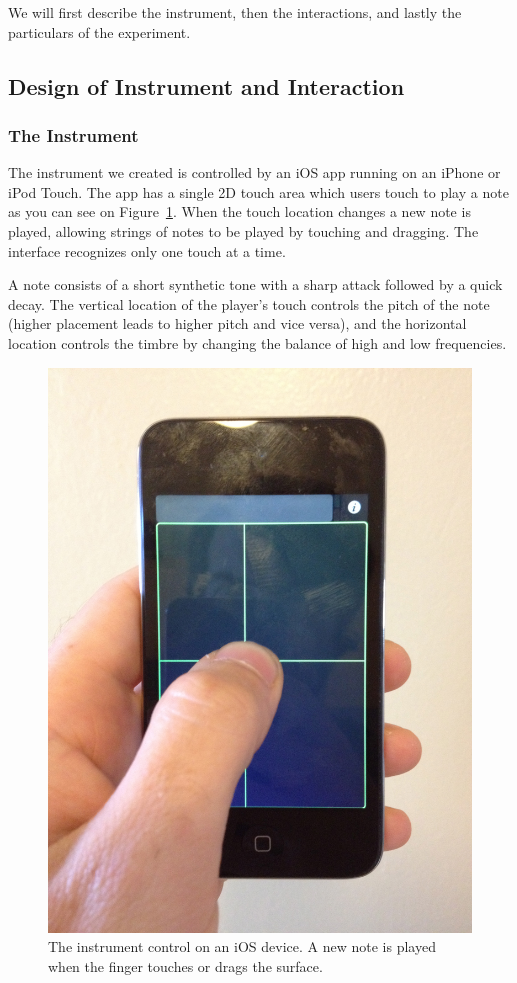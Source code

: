 \documentclass{article}
\begin{document}
We will first describe the instrument, then the interactions, and lastly the particulars of the experiment.


\subsection{Design of Instrument and Interaction}

\subsubsection{The Instrument}

The instrument we created is controlled by an iOS app running on an iPhone or iPod Touch. The app has a single 2D touch area which users touch to play a note as you can see on Figure~\ref{iphone}.
When the touch location changes a new note is played, allowing strings of notes to be played by touching and dragging.  The interface recognizes only one touch at a time.

A note consists of a short synthetic tone with a sharp attack followed by a quick decay.  The vertical location of the player's touch controls the pitch of the note (higher placement leads to higher pitch and vice versa), and the horizontal location controls the timbre by changing the balance of high and low frequencies.

\begin{figure}[tb]
\includegraphics[width=\columnwidth]{iphone.jpg}
\caption{The instrument control on an iOS device. A new note is played when the finger touches or drags the surface.}
\label{iphone}
\end{figure}
\end{document}
